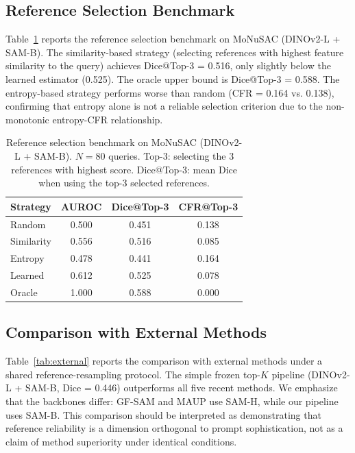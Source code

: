 \documentclass[11pt]{article}
\begin{document}
\subsection{Reference Selection Benchmark}

Table~\ref{tab:refsel} reports the reference selection benchmark on MoNuSAC
(DINOv2-L + SAM-B). The similarity-based strategy (selecting references with
highest feature similarity to the query) achieves Dice@Top-3 = 0.516, only
slightly below the learned estimator (0.525). The oracle upper bound is
Dice@Top-3 = 0.588. The entropy-based strategy performs worse than random
(CFR = 0.164 vs. 0.138), confirming that entropy alone is not a reliable
selection criterion due to the non-monotonic entropy-CFR relationship.

\begin{table}[t]
\centering
\caption{Reference selection benchmark on MoNuSAC (DINOv2-L + SAM-B).
  $N=80$ queries. Top-3: selecting the 3 references with highest score.
  Dice@Top-3: mean Dice when using the top-3 selected references.}
\label{tab:refsel}
\begin{tabular}{lccc}
\toprule
Strategy & AUROC & Dice@Top-3 & CFR@Top-3 \\
\midrule
Random       & 0.500 & 0.451 & 0.138 \\
Similarity   & 0.556 & 0.516 & 0.085 \\
Entropy      & 0.478 & 0.441 & 0.164 \\
Learned      & 0.612 & 0.525 & 0.078 \\
Oracle       & 1.000 & 0.588 & 0.000 \\
\bottomrule
\end{tabular}
\end{table}

\subsection{Comparison with External Methods}

Table~\ref{tab:external} reports the comparison with external methods under
a shared reference-resampling protocol. The simple frozen top-$K$ pipeline
(DINOv2-L + SAM-B, Dice = 0.446) outperforms all five recent methods. We
emphasize that the backbones differ: GF-SAM and MAUP use SAM-H, while our
pipeline uses SAM-B. This comparison should be interpreted as demonstrating
that reference reliability is a dimension orthogonal to prompt
sophistication, not as a claim of method superiority under identical
conditions.
\end{document}
